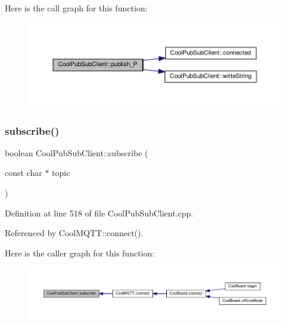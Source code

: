 Here is the call graph for this function\+:\nopagebreak
\begin{figure}[H]
\begin{center}
\leavevmode
\includegraphics[width=350pt]{d8/d4b/class_cool_pub_sub_client_a55458d47cf01f590e9b6647d5a418ab6_cgraph}
\end{center}
\end{figure}
\mbox{\label{class_cool_pub_sub_client_ac1ebc9ad874128aefa985d78496d2e8f}} 
\subsubsection{\texorpdfstring{subscribe()}{subscribe()}\hspace{0.1cm}{\footnotesize\ttfamily [1/2]}}
{\footnotesize\ttfamily boolean Cool\+Pub\+Sub\+Client\+::subscribe (\begin{DoxyParamCaption}\item[{const char $\ast$}]{topic }\end{DoxyParamCaption})}



Definition at line 518 of file Cool\+Pub\+Sub\+Client.\+cpp.



Referenced by Cool\+M\+Q\+T\+T\+::connect().

Here is the caller graph for this function\+:\nopagebreak
\begin{figure}[H]
\begin{center}
\leavevmode
\includegraphics[width=350pt]{d8/d4b/class_cool_pub_sub_client_ac1ebc9ad874128aefa985d78496d2e8f_icgraph}
\end{center}
\end{figure}
\mbox{\label{class_cool_pub_sub_client_aebf684e98588c52a72af1014f7957bee}} 
